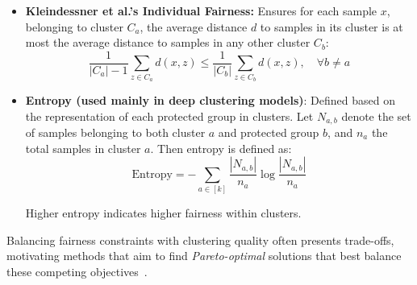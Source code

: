 \begin{itemize}
  \item \textbf{Kleindessner et al.'s Individual Fairness:} Ensures
    for each sample \(x\), belonging to cluster \(C_a\), the average
    distance \(d\) to samples in its cluster is at most the average
    distance to samples in any other cluster \(C_b\):
    \[
      \frac{1}{|C_a| - 1}\sum_{z \in C_a} d(x,z) \leq
      \frac{1}{|C_b|}\sum_{z \in C_b} d(x,z), \quad \forall b \neq a
    \]

  \item \textbf{Entropy (used mainly in deep clustering models)}:
    Defined based on the representation of each protected group in
    clusters. Let \(N_{a,b}\) denote the set of samples belonging to
    both cluster \(a\) and protected group \(b\), and \(n_a\) the
    total samples in cluster \(a\). Then entropy is defined as:
    \[
      \text{Entropy} = -\sum_{a \in [k]} \frac{|N_{a,b}|}{n_a} \log
      \frac{|N_{a,b}|}{n_a}
    \]

    Higher entropy indicates higher fairness within clusters.

\end{itemize}

Balancing fairness constraints with clustering quality often presents
trade-offs, motivating methods that aim to find \emph{Pareto-optimal}
solutions that best balance these competing objectives~\cite{ChhabraOverview}.

